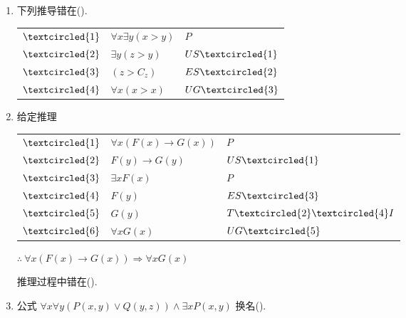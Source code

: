 \begin{enumerate}
	\item 下列推导错在(\quad).
	
	\begin{tabular}{lll}
		\(\textcircled{1}\) & \(\forall x\exists y(x>y)\) & \(P\) \\
		\(\textcircled{2}\) & \(\exists y(z>y)\) & \(US\textcircled{1}\) \\
		\(\textcircled{3}\) & \((z>C_z)\) & \(ES\textcircled{2}\) \\
		\(\textcircled{4}\) & \(\forall x(x>x)\) & \(UG\textcircled{3}\)
	\end{tabular}
	
	\item 给定推理
	
	\begin{tabular}{lll}
		\(\textcircled{1}\) & \(\forall x(F(x)\to G(x))\) & \(P\) \\
		\(\textcircled{2}\) & \(F(y)\to G(y)\) & \(US\textcircled{1}\) \\
		\(\textcircled{3}\) & \(\exists xF(x)\) & \(P\) \\
		\(\textcircled{4}\) & \(F(y)\) & \(ES\textcircled{3}\) \\
		\(\textcircled{5}\) & \(G(y)\) & \(T\textcircled{2}\textcircled{4}I\) \\
		\(\textcircled{6}\) & \(\forall xG(x)\) & \(UG\textcircled{5}\)
	\end{tabular}
	
	\(\therefore\ \forall x(F(x)\to G(x))\Rightarrow \forall xG(x)\)
	
	推理过程中错在(\quad).
	
	\item 公式 \(\forall x\forall y(P(x,y)\vee Q(y,z))\land \exists xP(x,y)\) 换名(\quad).
	

\end{enumerate}
